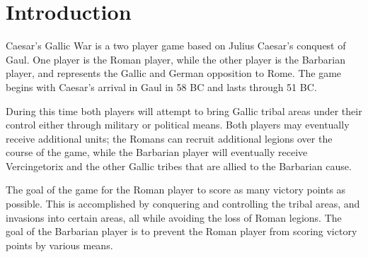 \section{Introduction}
\par
Caesar's Gallic War is a two player game based on Julius Caesar's conquest of Gaul. One player is the Roman player, while the other player is the Barbarian player, and represents the Gallic and German opposition to Rome. The game begins with Caesar's arrival in Gaul in 58 BC and lasts through 51 BC.
\par
During this time both players will attempt to bring Gallic tribal areas under their control either through military or political means. Both players may eventually receive additional units; the Romans can recruit additional legions over the course of the game, while the Barbarian player will eventually receive Vercingetorix and the other Gallic tribes that are allied to the Barbarian cause.

The goal of the game for the Roman player to score as many victory points as possible. This is accomplished by conquering and controlling the tribal areas, and invasions into certain areas, all while avoiding the loss of Roman legions. The goal of the Barbarian player is to prevent the Roman player from scoring victory points by various means.
